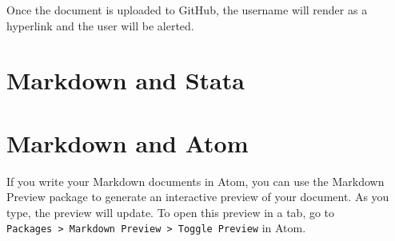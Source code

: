 \documentclass[]{book}
\begin{document}
Once the document is uploaded to GitHub, the username will render as a
hyperlink and the user will be alerted.

\section{Markdown and Stata}\label{markdown-and-stata}

\section{Markdown and Atom}\label{markdown-and-atom}

If you write your Markdown documents in Atom, you can use the Markdown
Preview package to generate an interactive preview of your document. As
you type, the preview will update. To open this preview in a tab, go to
\texttt{Packages\ \textgreater{}\ Markdown\ Preview\ \textgreater{}\ Toggle\ Preview}
in Atom.


\end{document}

